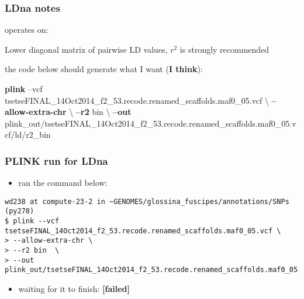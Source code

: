\documentclass[letterpaper]{scrartcl}
\newenvironment{Shaded}{}{}
\newcommand{\KeywordTok}[1]{\textcolor[rgb]{0.00,0.44,0.13}{\textbf{{#1}}}}
\newcommand{\NormalTok}[1]{{#1}}
\renewenvironment{quote}{\begin{blockquote}\list{}{\rightmargin=0em\leftmargin=0em}%
\item\relax\color{greytext}\ignorespaces}{\unskip\unskip\endlist\end{blockquote}}
\begin{document}
\subsubsection{LDna notes}\label{ldna-notes}

\begin{itemize}
\item
  operates on:

  \begin{quote}
  Lower diagonal matrix of pairwise LD values, \(r^2\) is strongly
  recommended
  \end{quote}
\item
  the code below should generate what I want (\textbf{I think}):
\end{itemize}

\begin{Shaded}
\begin{Highlighting}[]
\KeywordTok{plink} \NormalTok{--vcf tsetseFINAL_14Oct2014_f2_53.recode.renamed_scaffolds.maf0_05.vcf \textbackslash{}}
\KeywordTok{--allow-extra-chr} \NormalTok{\textbackslash{}}
\KeywordTok{--r2} \NormalTok{bin  \textbackslash{}}
\KeywordTok{--out} \NormalTok{plink_out/tsetseFINAL_14Oct2014_f2_53.recode.renamed_scaffolds.maf0_05.vcf/ld/r2_bin}
\end{Highlighting}
\end{Shaded}

\subsubsection{PLINK run for LDna}\label{plink-run-for-ldna}

\begin{itemize}
\itemsep1pt\parskip0pt
\item
  ran the command below:
\end{itemize}

\begin{verbatim}
wd238 at compute-23-2 in ~GENOMES/glossina_fuscipes/annotations/SNPs (py278)
$ plink --vcf tsetseFINAL_14Oct2014_f2_53.recode.renamed_scaffolds.maf0_05.vcf \
> --allow-extra-chr \
> --r2 bin  \
> --out plink_out/tsetseFINAL_14Oct2014_f2_53.recode.renamed_scaffolds.maf0_05.vcf/ld/r2_bin
\end{verbatim}

\begin{itemize}
\itemsep1pt\parskip0pt
\item
  waiting for it to finish: \textbf{{[}failed{]}}
\end{itemize}
\end{document}
